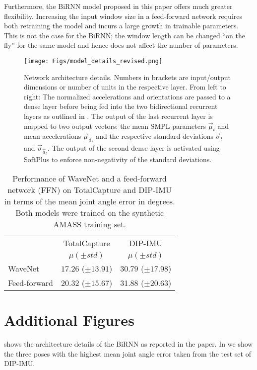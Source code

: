 \documentclass[acmtog]{acmart}
\begin{document}
Furthermore, the BiRNN model proposed in this paper offers much greater flexibility. Increasing the input window size in a feed-forward network requires both retraining the model and incurs a large growth in trainable parameters. This is not the case for the BiRNN; the window length can be changed ``on the fly'' for the same model and hence does not affect the number of parameters.

\begin{figure*}[tbh]
\centering
\texttt{[image: Figs/model\_details\_revised.png]}
\caption{Network architecture details. Numbers in brackets are input/output dimensions or number of units in the respective layer. From left to right: The normalized accelerations and orientations are passed to a dense layer before being fed into the two bidirectional recurrent layers as outlined in . The output of the last recurrent layer is mapped to two output vectors: the mean SMPL parameters $\vec{\mu}_t$ and mean accelerations $\vec{\mu}_{\vec{a}_t}$ and the respective standard deviations $\vec{\sigma}_t$ and $\vec{\sigma}_{\vec{a}_t}$. The output of the second dense layer is activated using SoftPlus to enforce non-negativity of the standard deviations.}
\label{fig:architecture}
\end{figure*}\begin{table}[bht]
	\caption{Performance of WaveNet and a feed-forward network (FFN) on TotalCapture and DIP-IMU in terms of the mean joint angle error in degrees. Both models were trained on the synthetic AMASS training set.}
	
	\begin{tabular}{l c c}
		\toprule
		& {TotalCapture} & {DIP-IMU}\\
		& $\mu (\pm std)$  & $\mu (\pm std)$ \\
		\hline
		WaveNet & $17.26$ ($\pm 13.91$) & $30.79$ ($\pm 17.98$) \\
		\hline
        Feed-forward & $20.32$ ($\pm 15.67$) & 31.88 ($\pm 20.63$) \\
        \hline
	\end{tabular}
    \label{tab:additional_architectures}
\end{table}\section{Additional Figures}\label{app:failure_cases} shows the architecture details of the BiRNN as reported in the paper. In  we show the three poses with the highest mean joint angle error taken from the test set of DIP-IMU.
\end{document}
